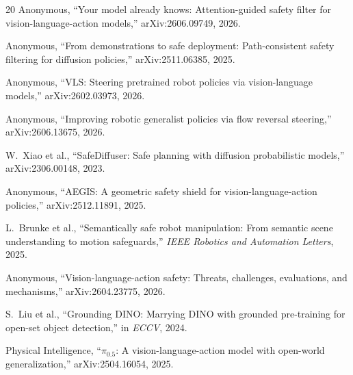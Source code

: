 \documentclass[conference]{IEEEtran}
\begin{document}
\begin{thebibliography}{20}
 Anonymous, ``Your model already knows: Attention-guided safety filter for vision-language-action models,'' arXiv:2606.09749, 2026.

 Anonymous, ``From demonstrations to safe deployment: Path-consistent safety filtering for diffusion policies,'' arXiv:2511.06385, 2025.

 Anonymous, ``VLS: Steering pretrained robot policies via vision-language models,'' arXiv:2602.03973, 2026.

 Anonymous, ``Improving robotic generalist policies via flow reversal steering,'' arXiv:2606.13675, 2026.

 W.~Xiao et al., ``SafeDiffuser: Safe planning with diffusion probabilistic models,'' arXiv:2306.00148, 2023.

 Anonymous, ``AEGIS: A geometric safety shield for vision-language-action policies,'' arXiv:2512.11891, 2025.

 L.~Brunke et al., ``Semantically safe robot manipulation: From semantic scene understanding to motion safeguards,'' \emph{IEEE Robotics and Automation Letters}, 2025.

 Anonymous, ``Vision-language-action safety: Threats, challenges, evaluations, and mechanisms,'' arXiv:2604.23775, 2026.

 S.~Liu et al., ``Grounding DINO: Marrying DINO with grounded pre-training for open-set object detection,'' in \emph{ECCV}, 2024.

 Physical Intelligence, ``$\pi_{0.5}$: A vision-language-action model with open-world generalization,'' arXiv:2504.16054, 2025.

\end{thebibliography}
\end{document}

